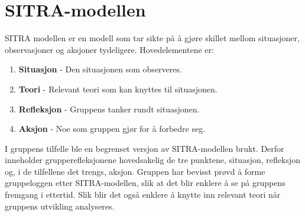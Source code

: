 \section{SITRA-modellen}
SITRA modellen er en modell som tar sikte på å gjøre skillet mellom situasjoner, observasjoner og aksjoner tydeligere.
Hovedelementene er:

\begin{enumerate}
  \item \textbf{Situasjon} - Den situasjonen som observeres.
  \item \textbf{Teori} - Relevant teori som kan knyttes til situasjonen.
  \item \textbf{Refleksjon} - Gruppens tanker rundt situasjonen.
  \item \textbf{Aksjon} - Noe som gruppen gjør for å forbedre seg. 
\end{enumerate}

I gruppens tilfelle ble en begrenset versjon av SITRA-modellen brukt. 
Derfor inneholder grupperefleksjonene hovedsakelig de tre punktene, situasjon, refleksjon og, i de tilfellene det trengs, aksjon.
Gruppen har bevisst prøvd å forme gruppeloggen etter SITRA-modellen, slik at det blir enklere å se på gruppens fremgang i ettertid. 
Slik blir det også enklere å knytte inn relevant teori når gruppens utvikling analyseres. 
